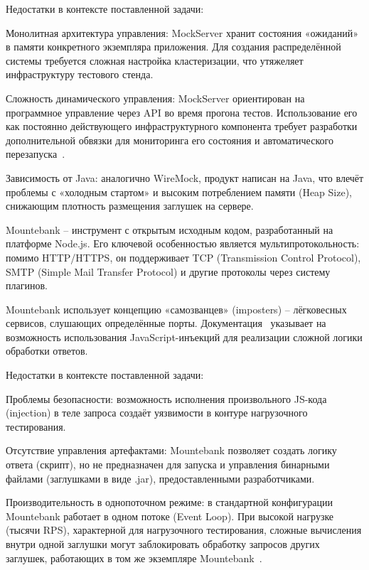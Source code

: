 Недостатки в контексте поставленной задачи:

\begin{compactlist}
\item Монолитная архитектура управления: MockServer хранит состояния «ожиданий» в памяти конкретного экземпляра приложения. Для создания распределённой системы требуется сложная настройка кластеризации, что утяжеляет инфраструктуру тестового стенда.
\item Сложность динамического управления: MockServer ориентирован на программное управление через API во время прогона тестов. Использование его как постоянно действующего инфраструктурного компонента требует разработки дополнительной обвязки для мониторинга его состояния и автоматического перезапуска~\cite{mockserver}.
\item Зависимость от Java: аналогично WireMock, продукт написан на Java, что влечёт проблемы с «холодным стартом» и высоким потреблением памяти (Heap Size), снижающим плотность размещения заглушек на сервере.
\end{compactlist}


Mountebank -- инструмент с открытым исходным кодом, разработанный на платформе Node.js. Его ключевой особенностью является мультипротокольность: помимо HTTP/HTTPS, он поддерживает TCP (Transmission Control Protocol), SMTP (Simple Mail Transfer Protocol) и другие протоколы через систему плагинов.

Mountebank использует концепцию «самозванцев» (imposters) -- лёгковесных сервисов, слушающих определённые порты. Документация~\cite{mountebank} указывает на возможность использования JavaScript-инъекций для реализации сложной логики обработки ответов.

Недостатки в контексте поставленной задачи:

\begin{compactlist}
\item Проблемы безопасности: возможность исполнения произвольного JS-кода (injection) в теле запроса создаёт уязвимости в контуре нагрузочного тестирования.
\item Отсутствие управления артефактами: Mountebank позволяет создать логику ответа (скрипт), но не предназначен для запуска и управления бинарными файлами (заглушками в виде .jar), предоставленными разработчиками.
\item Производительность в однопоточном режиме: в стандартной конфигурации Mountebank работает в одном потоке (Event Loop). При высокой нагрузке (тысячи RPS), характерной для нагрузочного тестирования, сложные вычисления внутри одной заглушки могут заблокировать обработку запросов других заглушек, работающих в том же экземпляре Mountebank~\cite{mountebank}.
\end{compactlist}

